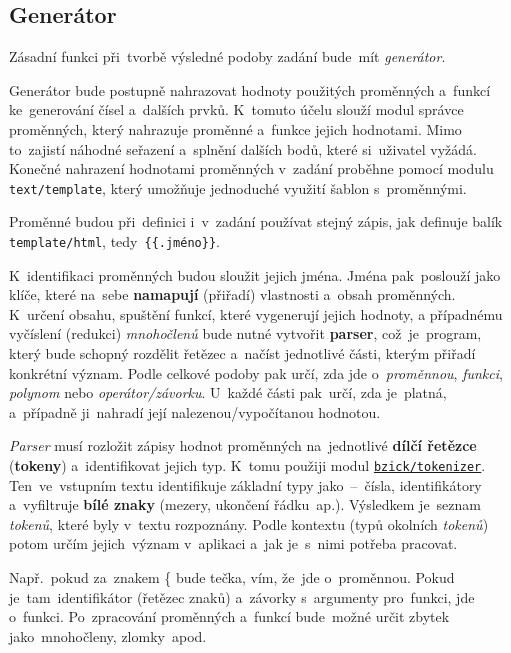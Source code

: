 \documentclass[11pt,a4paper]{report}
\begin{document}
        \subsection{Generátor}
            Zásadní funkci při~tvorbě výsledné podoby zadání bude~mít \emph{generátor}.
            
            Generátor bude postupně nahrazovat hodnoty použitých proměnných a~funkcí ke~generování čísel a~dalších prvků. K~tomuto účelu slouží modul správce proměnných, který nahrazuje proměnné a~funkce jejich hodnotami. Mimo to~zajistí náhodné seřazení a~splnění dalších bodů, které si~uživatel vyžádá. Konečné nahrazení hodnotami proměnných v~zadání proběhne pomocí modulu \texttt{text/template}, který umožňuje jednoduché využití šablon s~proměnnými.
            
            Proměnné budou při~definici i~v~zadání používat stejný zápis, jak definuje balík \texttt{template/html}, tedy~\texttt{\{\{.jméno\}\}}.

            K~identifikaci proměnných budou sloužit jejich jména. Jména pak~poslouží jako klíče, které na~sebe \textbf{namapují} (přiřadí) vlastnosti a~obsah proměnných. K~určení obsahu, spuštění funkcí, které vygenerují jejich hodnoty, a případnému vyčíslení (redukci) \emph{mnohočlenů} bude nutné vytvořit \textbf{parser}, což~je~program, který bude schopný rozdělit řetězec a~načíst jednotlivé části, kterým přiřadí konkrétní význam. Podle celkové podoby pak určí, zda jde o~\emph{proměnnou}, \emph{funkci}, \emph{polynom} nebo \emph{operátor/závorku}. U~každé části pak~určí, zda je~platná, a~případně ji~nahradí její nalezenou/vypočítanou hodnotou.
            
            \emph{Parser} musí rozložit zápisy hodnot proměnných na~jednotlivé \textbf{dílčí řetězce} (\textbf{tokeny}) a~identifikovat jejich typ. K~tomu použiji modul \href{github.com/bzick/tokenizer}{\texttt{bzick/tokenizer}}. Ten~ve~vstupním textu identifikuje základní typy jako~--~čísla, identifikátory a~vyfiltruje \textbf{bílé znaky} (mezery, ukončení řádku~ap.). Výsledkem je~seznam \emph{tokenů}, které byly v~textu rozpoznány. Podle kontextu (typů okolních \emph{tokenů}) potom určím jejich~význam v~aplikaci a~jak je~s~nimi potřeba pracovat.
            
            Např.~pokud za~znakem \{ bude tečka, vím, že~jde o~proměnnou. Pokud je~tam~identifikátor (řetězec znaků) a~závorky s~argumenty pro~funkci, jde o~funkci. Po~zpracování proměnných a~funkcí bude~možné určit zbytek jako~mnohočleny, zlomky~apod.
            
\end{document}

